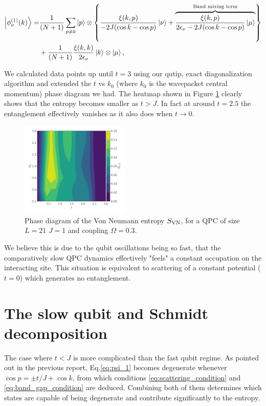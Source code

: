 \documentclass{article}
\begin{document}
\begin{align}\label{eq:psi_1}
    \ket{\phi_\nu^{(1)} (k)} = & \frac{1}{(N+1)}\sum_{p\neq k} \ket{p}\otimes \left \{ \frac{ \xi(k,p)}{ -2J( \cos k - \cos p ) } \ket{\nu} + \overbrace{\frac{ \xi(k,p)}{ 2\epsilon_\nu -2J( \cos k - \cos p )} \ket{\mu}}^{\text{Band mixing term}} \right \} \nonumber \\ 
    & + \frac{1}{(N+1)} \frac{\xi(k,k)}{2\epsilon_\nu} \ket{k}\otimes\ket{\mu},
\end{align}

We calculated data points up until $t=3$ using our qutip, exact diagonalization algorithm and extended the $t$ vs $k_0$ (where $k_0$ is the wavepacket central momentum) phase diagram we had. The heatmap shown in Figure \ref{fig:S_phase_diagram} clearly shows that the entropy becomes smaller as $t>J$. In fact at around $t=2.5$ the entanglement effectively vanishes as it also does when $t\rightarrow 0$. 

\begin{figure}[h]
    \centering
        \includegraphics[width=0.46\textwidth]{figures/report_08_2025/entropy_phase_diagram_L_=21_bw=2.0_Jp=1.0_om=0.3.pdf}
    \caption{Phase diagram of the Von Neumann entropy $S_{\rm{VN}}$, for a QPC of size $L=21$ $J=1$ and coupling $\Omega=0.3$.}
    \label{fig:S_phase_diagram}
\end{figure}

We believe this is due to the qubit oscillations being so fast, that the comparatively slow QPC dynamics effectively "feels" a constant occupation on the interacting site. This situation is equivalent to scattering of a constant potential ($t=0$) which generates no entanglement.

\section{The slow qubit and Schmidt decomposition}

The case where $t<J$ is more complicated than the fast qubit regime. As pointed out in the previous report, Eq.\eqref{eq:psi_1} becomes degenerate whenever $ \cos p = \pm t/J + \cos k$, from which conditions \eqref{eq:scattering_condition} and \eqref{eq:band_gap_condition} are deduced. Combining both of them determines which states are capable of being degenerate and contribute significantly to the entropy. 
\end{document}
